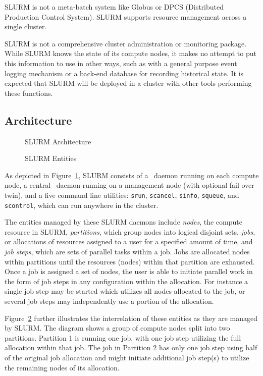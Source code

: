 SLURM is not a meta-batch system like Globus\cite{Globus2002}
or DPCS (Distributed Production Control System)\cite{DPCS2002}.  
SLURM supports resource management across a single cluster.

SLURM is not a comprehensive cluster administration or monitoring package.  
While SLURM knows the state of its compute nodes, it makes no attempt to put
this information to use in other ways, such as with a general purpose event
logging mechanism or a back-end database for recording historical state.
It is expected that SLURM will be deployed in a cluster with other 
tools performing these functions. 

\subsection{Architecture}


\begin{figure}[tb]
\centerline{}
\caption{SLURM Architecture}
\label{arch}
\end{figure}

\begin{figure}[tcb]
\centerline{}
\caption{SLURM Entities}
\label{entities}
\end{figure}


As depicted in Figure~\ref{arch}, SLURM consists of a \slurmd\ daemon
running on each compute node, a central \slurmctld\ daemon running on
a management node (with optional fail-over twin), and a five command line
utilities: {\tt srun}, {\tt scancel}, {\tt sinfo}, {\tt squeue}, and 
{\tt scontrol}, which can run anywhere in the cluster.  

The entities managed by these SLURM daemons include {\em nodes}, the
compute resource in SLURM, {\em partitions}, which group nodes into
logical disjoint sets, {\em jobs}, or allocations of resources assigned
to a user for a specified amount of time, and {\em job steps}, which are
sets of parallel tasks within a job.  Jobs are allocated nodes within partitions
until the resources (nodes) within that partition are exhausted. Once
a job is assigned a set of nodes, the user is able to initiate
parallel work in the form of job steps in any configuration within the
allocation. For instance a single job step may be started which utilizes
all nodes allocated to the job, or several job steps may independently 
use a portion of the allocation.

Figure~\ref{entities} further illustrates the interrelation of these
entities as they are managed by SLURM. The diagram shows a group of
compute nodes split into two partitions. Partition 1 is running one
job, with one job step utilizing the full allocation within that job.
The job in Partition 2 has only one job step using half of the original
job allocation and might initiate additional job step(s) to utilize 
the remaining nodes of its allocation.

